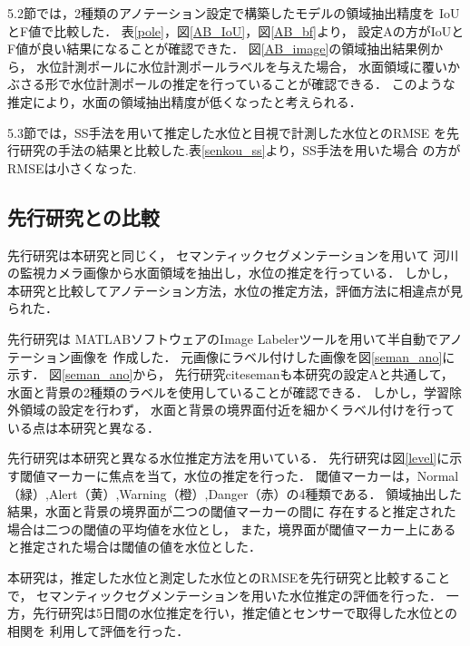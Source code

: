 5.2節では，2種類のアノテーション設定で構築したモデルの領域抽出精度を
IoUとF値で比較した．
表\ref{pole}，図\ref{AB_IoU}，図\ref{AB_bf}より，
設定Aの方がIoUとF値が良い結果になることが確認できた．
図\ref{AB_image}の領域抽出結果例から，
水位計測ポールに水位計測ポールラベルを与えた場合，
水面領域に覆いかぶさる形で水位計測ポールの推定を行っていることが確認できる．
このような推定により，水面の領域抽出精度が低くなったと考えられる．

5.3節では，SS手法を用いて推定した水位と目視で計測した水位とのRMSE
を先行研究の手法の結果と比較した.表\ref{senkou_ss}より，SS手法を用いた場合 
の方がRMSEは小さくなった.

\subsection{先行研究\cite{seman}との比較}
先行研究\cite{seman}は本研究と同じく，
セマンティックセグメンテーションを用いて
河川の監視カメラ画像から水面領域を抽出し，水位の推定を行っている．
しかし，本研究と比較してアノテーション方法，水位の推定方法，評価方法に相違点が見られた．

先行研究\cite{seman}は
MATLABソフトウェアのImage Labelerツールを用いて半自動でアノテーション画像を
作成した．
元画像にラベル付けした画像を図\ref{seman_ano}に示す．
図\ref{seman_ano}から，
先行研究cite{seman}も本研究の設定Aと共通して，水面と背景の2種類のラベルを使用していることが確認できる．
しかし，学習除外領域の設定を行わず，
水面と背景の境界面付近を細かくラベル付けを行っている点は本研究と異なる．

先行研究\cite{seman}は本研究と異なる水位推定方法を用いている．
先行研究は図\ref{level}に示す閾値マーカーに焦点を当て，水位の推定を行った．
閾値マーカーは，Normal（緑）,Alert（黄）,Warning（橙）,Danger（赤）の4種類である．
領域抽出した結果，水面と背景の境界面が二つの閾値マーカーの間に
存在すると推定された場合は二つの閾値の平均値を水位とし，
また，境界面が閾値マーカー上にあると推定された場合は閾値の値を水位とした．

本研究は，推定した水位と測定した水位とのRMSEを先行研究\cite{watanabe}と比較することで，
セマンティックセグメンテーションを用いた水位推定の評価を行った．
一方，先行研究\cite{seman}は5日間の水位推定を行い，推定値とセンサーで取得した水位との相関を
利用して評価を行った．


